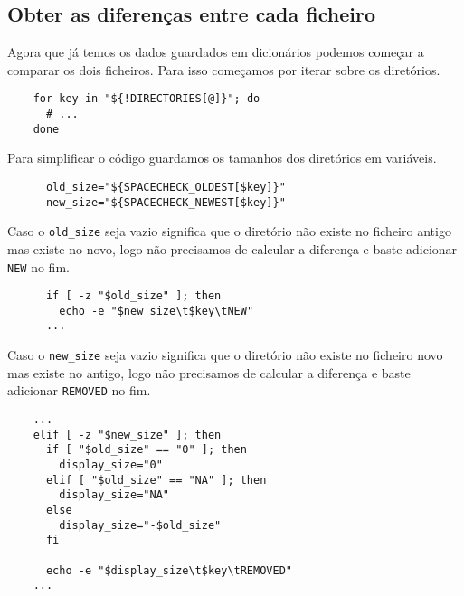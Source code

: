 \subsection{Obter as diferenças entre cada ficheiro}

Agora que já temos os dados guardados em dicionários podemos começar a comparar os dois ficheiros.
Para isso começamos por iterar sobre os diretórios.

\begin{listing}[H]
  \begin{verbatim}
    for key in "${!DIRECTORIES[@]}"; do
      # ...
    done
  \end{verbatim}
\end{listing}

Para simplificar o código guardamos os tamanhos dos diretórios em variáveis.

\begin{listing}[H]
  \begin{verbatim}
      old_size="${SPACECHECK_OLDEST[$key]}"
      new_size="${SPACECHECK_NEWEST[$key]}"
  \end{verbatim}
\end{listing}

Caso o \Verb|old_size| seja vazio significa que o diretório não existe no ficheiro antigo mas existe no novo, logo não precisamos de calcular a diferença e baste adicionar \Verb|NEW| no fim.

\begin{listing}[H]
  \begin{verbatim}
      if [ -z "$old_size" ]; then
        echo -e "$new_size\t$key\tNEW"
      ...
  \end{verbatim}
\end{listing}

Caso o \Verb|new_size| seja vazio significa que o diretório não existe no ficheiro novo mas existe no antigo, logo não precisamos de calcular a diferença e baste adicionar \Verb|REMOVED| no fim.

\begin{listing}[H]
  \begin{verbatim}
    ...
    elif [ -z "$new_size" ]; then
      if [ "$old_size" == "0" ]; then
        display_size="0"
      elif [ "$old_size" == "NA" ]; then
        display_size="NA"
      else
        display_size="-$old_size"
      fi

      echo -e "$display_size\t$key\tREMOVED"
    ...
  \end{verbatim}
\end{listing}

